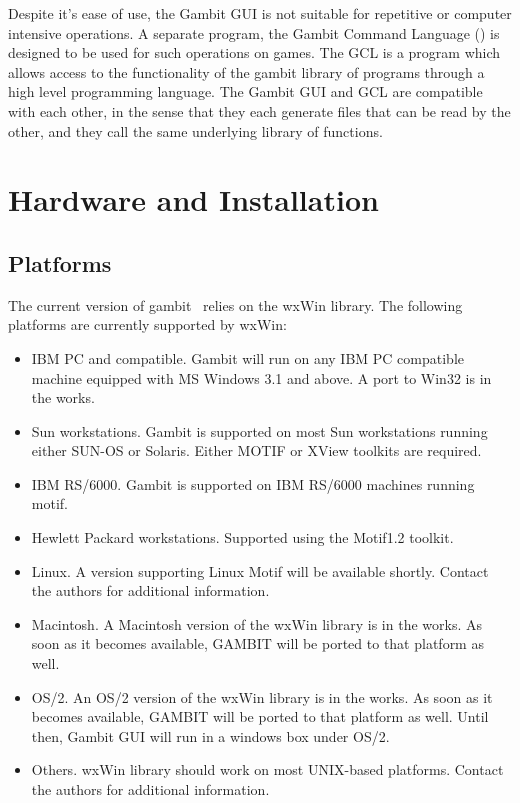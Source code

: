 Despite it's ease of use, the Gambit GUI is not suitable for repetitive or
computer intensive  operations.  A separate program, the Gambit Command
Language () is designed to be used for such operations 
on games.  The
GCL is a program which allows access to the functionality of the gambit
library of programs through a high level programming language.  The
Gambit GUI and GCL  are compatible with each other, in the sense that they
each generate files that can be read by the other, and they call the same
underlying library of functions.


\chapter{Hardware and Installation}
\section{Platforms}
The current version of gambit \ relies on the wxWin 
library.  The following platforms are currently supported by wxWin:
\begin{itemize}
\item IBM PC and compatible.  Gambit will run on any IBM PC compatible machine
equipped with MS Windows 3.1 and above.   A port to Win32 is in the works.
\item Sun workstations.  Gambit is supported on most Sun workstations running
either SUN-OS or Solaris.  Either MOTIF or XView toolkits are required.
\item IBM RS/6000. Gambit is supported on IBM RS/6000 machines running motif.
\item Hewlett Packard workstations.  Supported using the Motif1.2 toolkit.
\item Linux.  A version supporting Linux Motif will be available shortly. 
Contact the authors for additional information.
\item Macintosh. A Macintosh version of the wxWin library is in the works.  As
soon as it becomes available, GAMBIT will be ported to that platform as well.
\item OS/2.  An OS/2 version of the wxWin library is in the works.  As
soon as it becomes available, GAMBIT will be ported to that platform as well.
Until then, Gambit GUI will run in a windows box under OS/2.
\item Others.  wxWin library should work on most UNIX-based platforms.  Contact
the authors for additional information.
\end{itemize}
